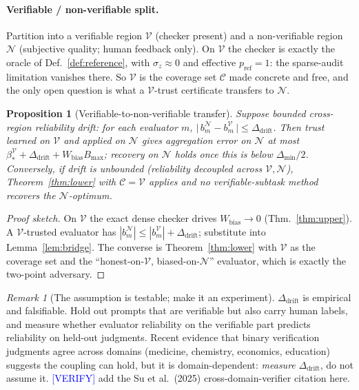 \documentclass[11pt]{article}
\newtheorem{proposition}{Proposition}
\theoremstyle{definition}
\theoremstyle{remark}
\newtheorem{remark}{Remark}
\newcommand{\Cov}{\mathcal{C}}
\begin{document}
\paragraph{Verifiable / non-verifiable split.}
Partition into a verifiable region $\mathcal V$ (checker present) and a non-verifiable region
$\mathcal N$ (subjective quality; human feedback only). On $\mathcal V$ the checker is exactly the
oracle of Def.~\ref{def:reference}, with $\sigma_z\!\approx\!0$ and effective $p_{\mathrm{ref}}\!=\!1$:
the sparse-audit limitation vanishes there. So $\mathcal V$ is the coverage set $\Cov$ made concrete
and free, and the only open question is what a $\mathcal V$-trust certificate transfers to
$\mathcal N$.

\begin{proposition}[Verifiable-to-non-verifiable transfer]
\label{prop:rlvr}
Suppose bounded cross-region reliability drift: for each evaluator $m$,
$\big|\,b_m^{\mathcal N}-b_m^{\mathcal V}\,\big|\le \Delta_{\mathrm{drift}}$. Then trust learned on
$\mathcal V$ and applied on $\mathcal N$ gives aggregation error on $\mathcal N$ at most
$\beta_{\ast}^{\mathcal V}+\Delta_{\mathrm{drift}}+W_{\mathrm{bias}}B_{\max}$; recovery on
$\mathcal N$ holds once this is below $\Delta_{\min}/2$. Conversely, if drift is unbounded
(reliability decoupled across $\mathcal V,\mathcal N$), Theorem~\ref{thm:lower} with
$\Cov=\mathcal V$ applies and \emph{no} verifiable-subtask method recovers the $\mathcal N$-optimum.
\end{proposition}

\begin{proof}[Proof sketch]
On $\mathcal V$ the exact dense checker drives $W_{\mathrm{bias}}\!\to\!0$ (Thm.~\ref{thm:upper}). A
$\mathcal V$-trusted evaluator has $|b_m^{\mathcal N}|\le|b_m^{\mathcal V}|+\Delta_{\mathrm{drift}}$;
substitute into Lemma~\ref{lem:bridge}. The converse is Theorem~\ref{thm:lower} with $\mathcal V$ as
the coverage set and the ``honest-on-$\mathcal V$, biased-on-$\mathcal N$'' evaluator, which is
exactly the two-point adversary.
\end{proof}

\begin{remark}[The assumption is testable; make it an experiment]
$\Delta_{\mathrm{drift}}$ is empirical and falsifiable. Hold out prompts that are verifiable but
also carry human labels, and measure whether evaluator reliability on the verifiable part predicts
reliability on held-out judgments. Recent evidence that binary verification judgments agree across
domains (medicine, chemistry, economics, education) suggests the coupling can hold, but it is
domain-dependent: \emph{measure} $\Delta_{\mathrm{drift}}$, do not assume it.
\textcolor{blue}{[VERIFY]} add the Su et al.\ (2025) cross-domain-verifier citation here.
\end{remark}
\end{document}
